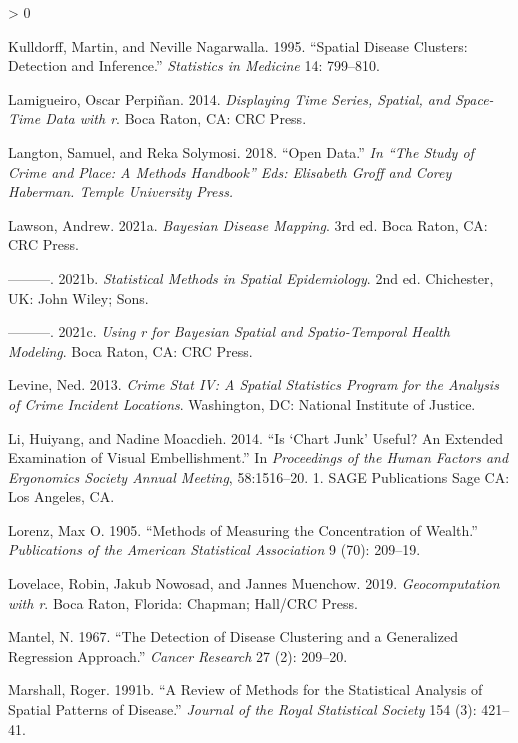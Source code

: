 \documentclass[
  krantz2]{krantz}
\newlength{\cslhangindent}
\newenvironment{CSLReferences}[2] %
 {%
  \setlength{\parindent}{0pt}
  \ifodd #1 \everypar{\setlength{\hangindent}{\cslhangindent}}\ignorespaces\fi
  \ifnum #2 > 0
  \setlength{\parskip}{#2\baselineskip}
  \fi
 }%
 {}
\begin{document}
\begin{CSLReferences}{1}{0}
\leavevmode\hypertarget{ref-Kulldorff_1995}{}%
Kulldorff, Martin, and Neville Nagarwalla. 1995. {``Spatial Disease Clusters: Detection and Inference.''} \emph{Statistics in Medicine} 14: 799--810.

\leavevmode\hypertarget{ref-Perpinan_2014}{}%
Lamigueiro, Oscar Perpiñan. 2014. \emph{Displaying Time Series, Spatial, and Space-Time Data with r}. Boca Raton, CA: CRC Press.

\leavevmode\hypertarget{ref-Langton_2018}{}%
Langton, Samuel, and Reka Solymosi. 2018. {``Open Data.''} \emph{In {``The Study of Crime and Place: A Methods Handbook''} Eds: Elisabeth Groff and Corey Haberman. Temple University Press.}

\leavevmode\hypertarget{ref-Lawson_2021a}{}%
Lawson, Andrew. 2021a. \emph{Bayesian Disease Mapping}. 3rd ed. Boca Raton, CA: CRC Press.

\leavevmode\hypertarget{ref-Lawson_2006}{}%
---------. 2021b. \emph{Statistical Methods in Spatial Epidemiology}. 2nd ed. Chichester, UK: John Wiley; Sons.

\leavevmode\hypertarget{ref-Lawson_2021b}{}%
---------. 2021c. \emph{Using r for Bayesian Spatial and Spatio-Temporal Health Modeling}. Boca Raton, CA: CRC Press.

\leavevmode\hypertarget{ref-Levine_2013}{}%
Levine, Ned. 2013. \emph{Crime Stat IV: A Spatial Statistics Program for the Analysis of Crime Incident Locations}. Washington, DC: National Institute of Justice.

\leavevmode\hypertarget{ref-Li_2014}{}%
Li, Huiyang, and Nadine Moacdieh. 2014. {``Is {`Chart Junk'} Useful? An Extended Examination of Visual Embellishment.''} In \emph{Proceedings of the Human Factors and Ergonomics Society Annual Meeting}, 58:1516--20. 1. SAGE Publications Sage CA: Los Angeles, CA.

\leavevmode\hypertarget{ref-lorenz1905methods}{}%
Lorenz, Max O. 1905. {``Methods of Measuring the Concentration of Wealth.''} \emph{Publications of the American Statistical Association} 9 (70): 209--19.

\leavevmode\hypertarget{ref-Lovelace_2019}{}%
Lovelace, Robin, Jakub Nowosad, and Jannes Muenchow. 2019. \emph{Geocomputation with r}. Boca Raton, Florida: Chapman; Hall/CRC Press.

\leavevmode\hypertarget{ref-Mantel_1967}{}%
Mantel, N. 1967. {``The Detection of Disease Clustering and a Generalized Regression Approach.''} \emph{Cancer Research} 27 (2): 209--20.

\leavevmode\hypertarget{ref-Marshall_1991b}{}%
Marshall, Roger. 1991b. {``A Review of Methods for the Statistical Analysis of Spatial Patterns of Disease.''} \emph{Journal of the Royal Statistical Society} 154 (3): 421--41.


\end{CSLReferences}
\end{document}
